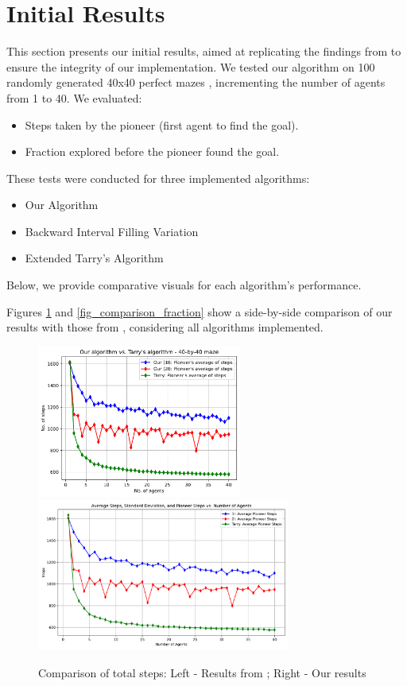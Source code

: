 \section{Initial Results}
\label{section_result_initial_results}

This section presents our initial results,
aimed at replicating the findings from  to ensure the integrity of our implementation.
We tested our algorithm on 100 randomly generated 40x40 perfect mazes \cite{Naeem2021}, incrementing the number of agents from 1 to 40.
We evaluated:

\begin{itemize}
    \item Steps taken by the pioneer (first agent to find the goal).
    \item Fraction explored before the pioneer found the goal.
\end{itemize}

These tests were conducted for three implemented algorithms:

\begin{itemize}
\item Our Algorithm
\item Backward Interval Filling Variation
\item Extended Tarry's Algorithm \cite{Kivelevitch2010}
\end{itemize}

Below, we provide comparative visuals for each algorithm's performance.

Figures \ref{fig_comparison_steps} and \ref{fig_comparison_fraction} show a side-by-side comparison of our results with those from ,
considering all algorithms implemented.

\begin{figure}[H]
\centering
\includegraphics[height=5cm]{Cap3/arthur_tarry_40x40_steps.pdf}
\includegraphics[height=5cm]{Cap3/self_steps_40_by_40_tarry.pdf}
\caption{Comparison of total steps: Left - Results from ; Right - Our results}
\label{fig_comparison_steps}
\end{figure}

